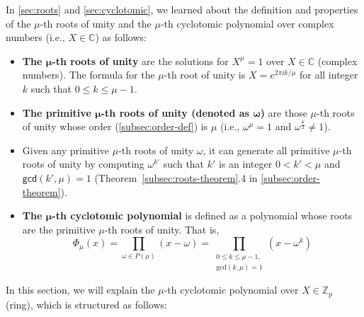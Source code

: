 
In \autoref{sec:roots} and \autoref{sec:cyclotomic}, we learned about the definition and properties of the $\mu$-th roots of unity and the $\mu$-th cyclotomic polynomial over complex numbers (i.e., $X \in \mathbb{C}$) as follows: 

\begin{itemize}
\item \textbf{The $\bm \mu$-th roots of unity} are the solutions for $X^\mu = 1$ over $X \in \mathbb{C}$ (complex numbers). The formula for the $\mu$-th root of unity is $X = e^{2 \pi i k / \mu}$ for all integer $k$ such that $0 \leq k \leq \mu - 1$. 
\item \textbf{The primitive $\bm \mu$-th roots of unity (denoted as $\bm \omega$)} are those $\mu$-th roots of unity whose order (\autoref{subsec:order-def}) is $\mu$ (i.e., $\omega^{\mu} = 1$ and $\omega^{\frac{\mu}{2}} \neq 1$). 
\item Given any primitive $\mu$-th roots of unity $\omega$, it can generate all primitive $\mu$-th roots of unity by computing $\omega^{k'}$ such that $k'$ is an integer $0 < k' < \mu$ and $\textsf{gcd}(k', \mu) = 1$ (Theorem~\ref*{subsec:roots-theorem}.4 in \autoref{subsec:order-theorem}). 
\item \textbf{The $\bm \mu$-th cyclotomic polynomial} is defined as a polynomial whose roots are the primitive $\mu$-th roots of unity. That is, \[ \Phi_{\mu}(x) = \prod_{\omega \in P({\mu})} (x - \omega) = \prod_{\substack{0 \leq k \leq {\mu}-1,\\ \text{gcd}(k, {\mu}) = 1}} (x - \omega^k) \]
\end{itemize}

In this section, we will explain the $\mu$-th cyclotomic polynomial over $X \in \mathbb{Z}_p$ (ring), which is structured as follows: 

